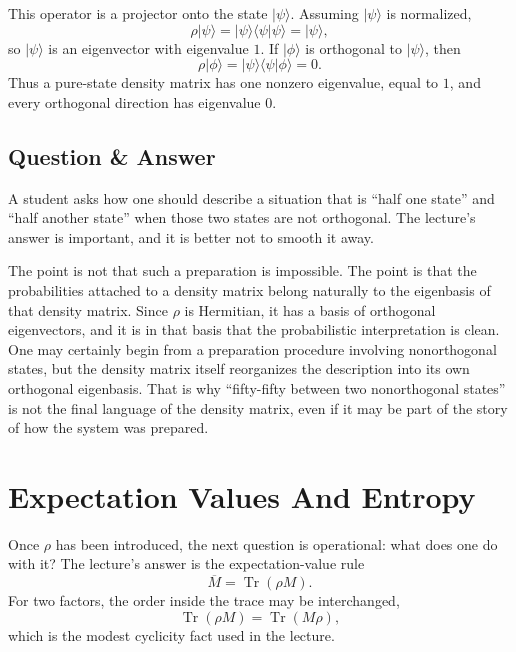This operator is a projector onto the state \(|\psi\rangle\). Assuming \(|\psi\rangle\) is normalized,
\begin{equation}
\rho |\psi\rangle
=
|\psi\rangle\langle\psi|\psi\rangle
=
|\psi\rangle,
\end{equation}
so \(|\psi\rangle\) is an eigenvector with eigenvalue \(1\). If \(|\phi\rangle\) is orthogonal to \(|\psi\rangle\), then
\begin{equation}
\rho|\phi\rangle
=
|\psi\rangle\langle\psi|\phi\rangle
=
0.
\end{equation}
Thus a pure-state density matrix has one nonzero eigenvalue, equal to \(1\), and every orthogonal direction has eigenvalue \(0\).

\subsection{Question \& Answer}

A student asks how one should describe a situation that is ``half one state'' and ``half another state'' when those two states are not orthogonal. The lecture's answer is important, and it is better not to smooth it away.

The point is not that such a preparation is impossible. The point is that the probabilities attached to a density matrix belong naturally to the eigenbasis of that density matrix. Since \(\rho\) is Hermitian, it has a basis of orthogonal eigenvectors, and it is in that basis that the probabilistic interpretation is clean. One may certainly begin from a preparation procedure involving nonorthogonal states, but the density matrix itself reorganizes the description into its own orthogonal eigenbasis. That is why ``fifty-fifty between two nonorthogonal states'' is not the final language of the density matrix, even if it may be part of the story of how the system was prepared.

\section{Expectation Values And Entropy}

Once \(\rho\) has been introduced, the next question is operational: what does one do with it? The lecture's answer is the expectation-value rule
\begin{equation}
\overline{M} = \operatorname{Tr}(\rho M).
\end{equation}
For two factors, the order inside the trace may be interchanged,
\begin{equation}
\operatorname{Tr}(\rho M) = \operatorname{Tr}(M\rho),
\end{equation}
which is the modest cyclicity fact used in the lecture.

